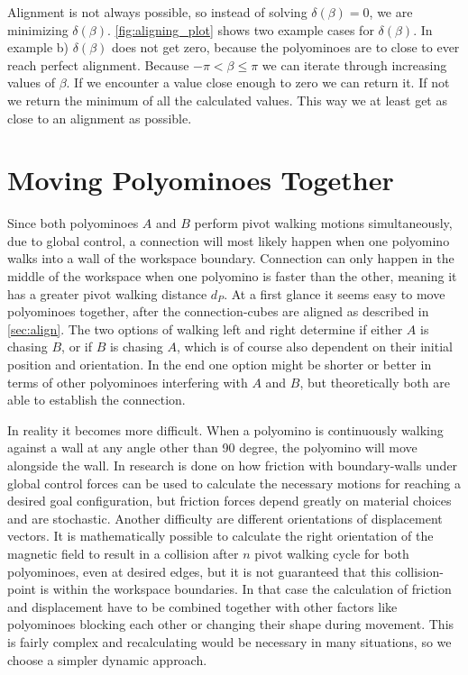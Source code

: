 Alignment is not always possible, so instead of solving $\delta(\beta) = 0$, we are minimizing $\delta(\beta)$.
\autoref{fig:aligning_plot} shows two example cases for $\delta(\beta)$.
In example b) $\delta(\beta)$ does not get zero, because the polyominoes are to close to ever reach perfect alignment.
Because $-\pi < \beta \leq \pi$ we can iterate through increasing values of $\beta$.
If we encounter a value close enough to zero we can return it.
If not we return the minimum of all the calculated values.
This way we at least get as close to an alignment as possible.


\section{Moving Polyominoes Together}
\label{sec:walk_wait}

Since both polyominoes $A$ and $B$ perform pivot walking motions simultaneously, due to global control, a connection will most likely happen when one polyomino walks into a wall of the workspace boundary.
Connection can only happen in the middle of the workspace when one polyomino is faster than the other, meaning it has a greater pivot walking distance $d_P$.
At a first glance it seems easy to move polyominoes together, after the connection-cubes are aligned as described in \autoref{sec:align}.
The two options of walking left and right determine if either $A$ is chasing $B$, or if $B$ is chasing $A$, which is of course also dependent on their initial position and orientation.
In the end one option might be shorter or better in terms of other polyominoes interfering with $A$ and $B$, but theoretically both are able to establish the connection.

In reality it becomes more difficult.
When a polyomino is continuously walking against a wall at any angle other than 90 degree, the polyomino will move alongside the wall.
In \cite{schmidt2020} research is done on how friction with boundary-walls under global control forces can be used to calculate the necessary motions for reaching a desired goal configuration, but friction forces depend greatly on material choices and are stochastic.
Another difficulty are different orientations of displacement vectors.
It is mathematically possible to calculate the right orientation of the magnetic field to result in a collision after $n$ pivot walking cycle for both polyominoes, even at desired edges, but it is not guaranteed that this collision-point is within the workspace boundaries.
In that case the calculation of friction and displacement have to be combined together with other factors like polyominoes blocking each other or changing their shape during movement.
This is fairly complex and recalculating would be necessary in many situations, so we choose a simpler dynamic approach.

